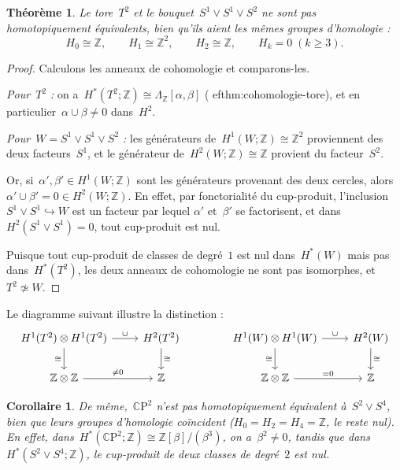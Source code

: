 \documentclass[12pt,a4paper,openany]{book}
\theoremstyle{definition}
\theoremstyle{plain}
\newtheorem{theoreme}[definition]{Théorème}
\newtheorem{corollaire}[definition]{Corollaire}
\theoremstyle{remark}
\newcommand{\Z}{\mathbb{Z}}
\newcommand{\CP}{\mathbb{C}\mathrm{P}}
\begin{document}
\begin{theoreme}\label{thm:tore-vs-bouquet}
Le tore~$T^2$ et le bouquet~$S^1 \vee S^1 \vee S^2$ ne sont pas homotopiquement
équivalents, bien qu'ils aient les mêmes groupes d'homologie :
\[
  H_0 \cong \Z, \qquad H_1 \cong \Z^2, \qquad H_2 \cong \Z, \qquad H_k = 0 \; (k \geqslant 3).
\]
\end{theoreme}

\begin{proof}
Calculons les anneaux de cohomologie et comparons-les.

\noindent\emph{Pour~$T^2$ :} on a~$H^*(T^2;\Z) \cong \Lambda_\Z[\alpha,\beta]$
(
ef{thm:cohomologie-tore}), et en particulier~$\alpha \cup \beta \neq 0$
dans~$H^2$.

\noindent\emph{Pour~$W = S^1 \vee S^1 \vee S^2$ :} les générateurs de~$H^1(W;\Z) \cong \Z^2$
proviennent des deux facteurs~$S^1$, et le générateur de~$H^2(W;\Z) \cong \Z$
provient du facteur~$S^2$.

Or, si~$\alpha', \beta' \in H^1(W;\Z)$ sont les générateurs provenant des deux cercles,
alors~$\alpha' \cup \beta' = 0 \in H^2(W;\Z)$. En effet, par fonctorialité du
cup-produit, l'inclusion~$S^1 \vee S^1 \hookrightarrow W$ est un facteur par lequel
$\alpha'$ et~$\beta'$ se factorisent, et dans~$H^2(S^1 \vee S^1) = 0$, tout
cup-produit est nul.

Puisque tout cup-produit de classes de degré~$1$ est nul dans~$H^*(W)$ mais pas
dans~$H^*(T^2)$, les deux anneaux de cohomologie ne sont pas isomorphes, et
$T^2 \not\simeq W$.
\end{proof}

Le diagramme suivant illustre la distinction :
\[
\begin{tikzcd}[row sep=2em]
  H^1(T^2) \otimes H^1(T^2) \ar[r, "\cup"] \ar[d, "\cong"']
  & H^2(T^2) \ar[d, "\cong"]\\
  \Z \otimes \Z \ar[r, "\neq 0"]
  & \Z
\end{tikzcd}
\qquad\qquad
\begin{tikzcd}[row sep=2em]
  H^1(W) \otimes H^1(W) \ar[r, "\cup"] \ar[d, "\cong"']
  & H^2(W) \ar[d, "\cong"]\\
  \Z \otimes \Z \ar[r, "= 0"]
  & \Z
\end{tikzcd}
\]

\begin{corollaire}\label{cor:cp2-vs-bouquet}
\index{$\CP^2$!vs bouquet}
De même,~$\CP^2$ n'est pas homotopiquement équivalent à~$S^2 \vee S^4$, bien que
leurs groupes d'homologie coïncident ($H_0 = H_2 = H_4 = \Z$, le reste nul).
En effet, dans~$H^*(\CP^2;\Z) \cong \Z[\beta]/(\beta^3)$, on a~$\beta^2 \neq 0$,
tandis que dans~$H^*(S^2 \vee S^4;\Z)$, le cup-produit de deux classes de degré~$2$
est nul.
\end{corollaire}
\end{document}
